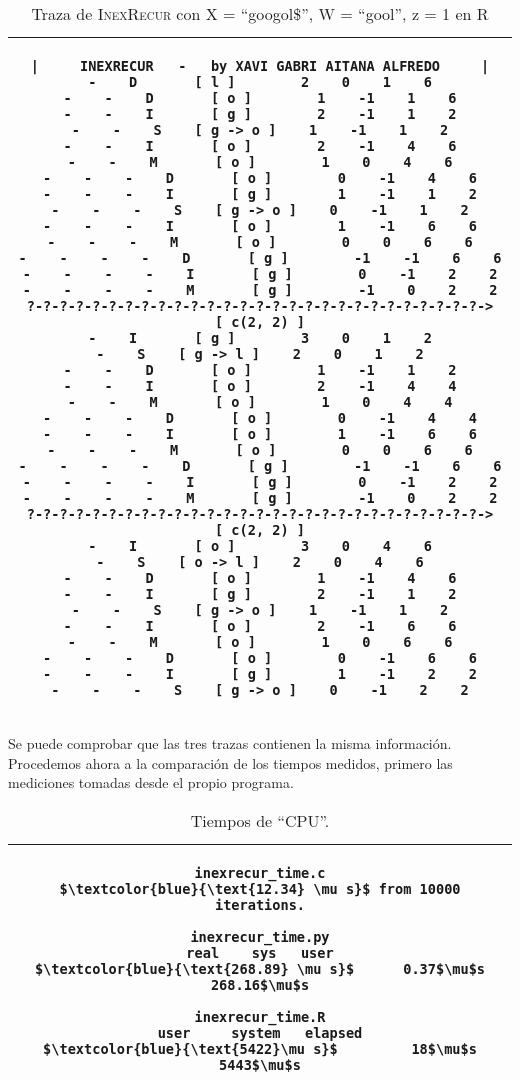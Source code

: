 \documentclass{article}
\newcommand{\tempcaption}{}
\newenvironment{code}[4]{
\begin{table}[h!]
\gdef\tempcaption{Traza de \textsc{InexRecur} con X = ``#1'', W = ``#2'', z = #3 en #4}
\centering
\begin{tabular}{|c|}
\hline }
{\\\hline
\end{tabular}
\caption{\protect\tempcaption}
\end{table} }
\newenvironment{codesnip}[1]{
\begin{table}[h!]
\gdef\tempcaption{#1}
\centering
\begin{tabular}{|c|}
\hline}
{\\\hline
\end{tabular}
\caption{\tempcaption}
\end{table}}
\newcommand{\R}{R }
\begin{document}
\vfill
\begin{code}{googol\$}{gool}{1}{\R}
\begin{lstlisting}
|     INEXRECUR   -   by XAVI GABRI AITANA ALFREDO     |
-    D       [ l ]        2    0    1    6
-    -    D       [ o ]        1    -1    1    6
-    -    I       [ g ]        2    -1    1    2
-    -    S    [ g -> o ]    1    -1    1    2
-    -    I       [ o ]        2    -1    4    6
-    -    M       [ o ]        1    0    4    6
-    -    -    D       [ o ]        0    -1    4    6
-    -    -    I       [ g ]        1    -1    1    2
-    -    -    S    [ g -> o ]    0    -1    1    2
-    -    -    I       [ o ]        1    -1    6    6
-    -    -    M       [ o ]        0    0    6    6
-    -    -    -    D       [ g ]        -1    -1    6    6
-    -    -    -    I       [ g ]        0    -1    2    2
-    -    -    -    M       [ g ]        -1    0    2    2
?-?-?-?-?-?-?-?-?-?-?-?-?-?-?-?-?-?-?-?-?-?-?-?-?-?-?-?->  [ c(2, 2) ]
-    I       [ g ]        3    0    1    2
-    S    [ g -> l ]    2    0    1    2
-    -    D       [ o ]        1    -1    1    2
-    -    I       [ o ]        2    -1    4    4
-    -    M       [ o ]        1    0    4    4
-    -    -    D       [ o ]        0    -1    4    4
-    -    -    I       [ o ]        1    -1    6    6
-    -    -    M       [ o ]        0    0    6    6
-    -    -    -    D       [ g ]        -1    -1    6    6
-    -    -    -    I       [ g ]        0    -1    2    2
-    -    -    -    M       [ g ]        -1    0    2    2
?-?-?-?-?-?-?-?-?-?-?-?-?-?-?-?-?-?-?-?-?-?-?-?-?-?-?-?->  [ c(2, 2) ]
-    I       [ o ]        3    0    4    6
-    S    [ o -> l ]    2    0    4    6
-    -    D       [ o ]        1    -1    4    6
-    -    I       [ g ]        2    -1    1    2
-    -    S    [ g -> o ]    1    -1    1    2
-    -    I       [ o ]        2    -1    6    6
-    -    M       [ o ]        1    0    6    6
-    -    -    D       [ o ]        0    -1    6    6
-    -    -    I       [ g ]        1    -1    2    2
-    -    -    S    [ g -> o ]    0    -1    2    2
\end{lstlisting}
\end{code}
\vfill

\clearpage

Se puede comprobar que las tres trazas contienen la misma información.
Procedemos ahora a la comparación de los tiempos medidos, primero las
mediciones tomadas desde el propio programa.
\begin{codesnip}{Tiempos de ``CPU''.}
\begin{lstlisting}
inexrecur_time.c
$\textcolor{blue}{\text{12.34} \mu s}$ from 10000 iterations.

inexrecur_time.py
real    sys   user
$\textcolor{blue}{\text{268.89} \mu s}$      0.37$\mu$s 268.16$\mu$s

inexrecur_time.R
user     system   elapsed
$\textcolor{blue}{\text{5422}\mu s}$         18$\mu$s      5443$\mu$s
\end{lstlisting}
\end{codesnip}
\end{document}
